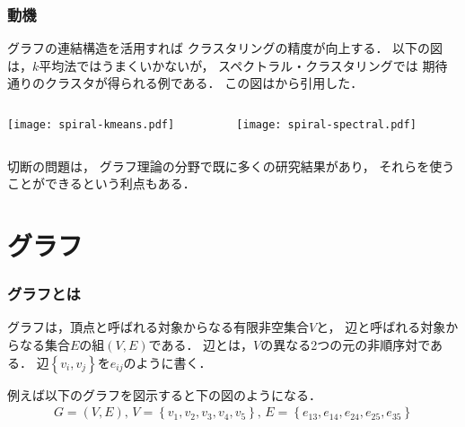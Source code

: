 \documentclass[10pt,hyperref={unicode}]{beamer}
\newcommand{\parentheses}[1]{\left(#1\right)}
\newcommand{\braces}[1]{\left\{#1\right\}}
\begin{document}
\begin{frame}
\frametitle{動機}
グラフの連結構造を活用すれば
クラスタリングの精度が向上する．
以下の図は，$k$平均法ではうまくいかないが，
スペクトラル・クラスタリングでは
期待通りのクラスタが得られる例である．
この図は\cite{murphy2012}から引用した．

    \begin{columns}
        \begin{column}{0.5\textwidth}
            \begin{center}
                \texttt{[image: spiral-kmeans.pdf]}
            \end{center}
        \end{column}
        \begin{column}{0.5\textwidth}
            \begin{center}
                \texttt{[image: spiral-spectral.pdf]}
            \end{center}
        \end{column}
    \end{columns}

切断の問題は，
グラフ理論の分野で既に多くの研究結果があり，
それらを使うことができるという利点もある．
\end{frame}


\section{グラフ}
\begin{frame}
\frametitle{グラフとは}
グラフは，頂点と呼ばれる対象からなる有限非空集合$V$と，
辺と呼ばれる対象からなる集合$E$の組$\parentheses{V,E}$である．
辺とは，$V$の異なる2つの元の非順序対である．
辺$\braces{v_i,v_j}$を$e_{ij}$のように書く．

\bigskip

例えば以下のグラフを図示すると下の図のようになる．
\begin{gather*}
    G = \parentheses{V,E},\,V = \braces{v_1,v_2,v_3,v_4,v_5},\,
    E = \braces{e_{13},e_{14},e_{24},e_{25},e_{35}}
\end{gather*}

\begin{center}
\end{center}
\end{frame}
\end{document}
